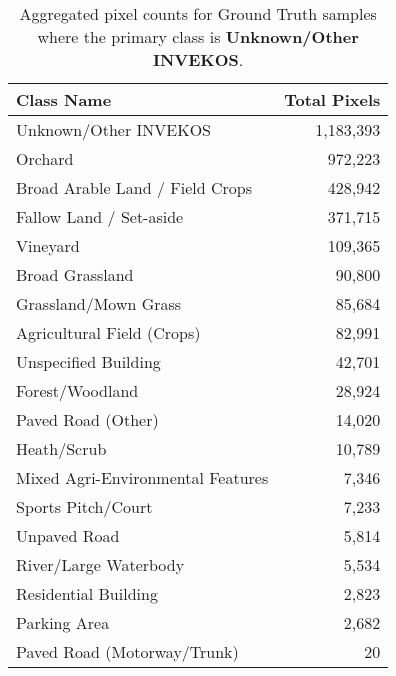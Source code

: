 \begin{table}[H] %
    \centering
    \caption{Aggregated pixel counts for Ground Truth samples where the primary class is \textbf{Unknown/Other INVEKOS}.}
    \label{tab:gt_counts_0}
    \begin{tabular}{lr}
        \hline
        \textbf{Class Name} & \textbf{Total Pixels} \\
        \hline
        Unknown/Other INVEKOS & 1,183,393 \\
        Orchard & 972,223 \\
        Broad Arable Land / Field Crops & 428,942 \\
        Fallow Land / Set-aside & 371,715 \\
        Vineyard & 109,365 \\
        Broad Grassland & 90,800 \\
        Grassland/Mown Grass & 85,684 \\
        Agricultural Field (Crops) & 82,991 \\
        Unspecified Building & 42,701 \\
        Forest/Woodland & 28,924 \\
        Paved Road (Other) & 14,020 \\
        Heath/Scrub & 10,789 \\
        Mixed Agri-Environmental Features & 7,346 \\
        Sports Pitch/Court & 7,233 \\
        Unpaved Road & 5,814 \\
        River/Large Waterbody & 5,534 \\
        Residential Building & 2,823 \\
        Parking Area & 2,682 \\
        Paved Road (Motorway/Trunk) & 20 \\
        \hline
    \end{tabular}
\end{table}

